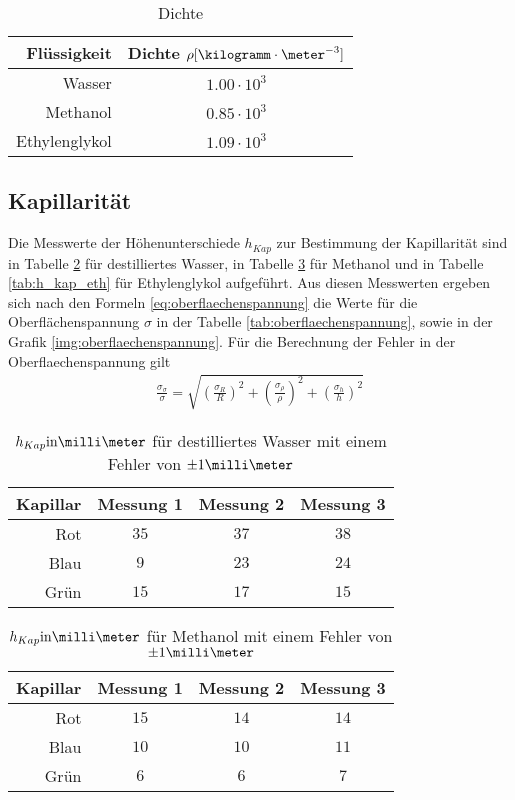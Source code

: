 \documentclass[12pt, a4paper, twoside]{scrartcl}
\begin{document}
\begin{table}[!h]
\centering
\begin{tabular}{r|c}
    Flüssigkeit & Dichte $\rho [\kilogramm\cdot\meter^{-3}]$\\
    \hline
    Wasser & $1.00\cdot 10^{3}$\\
    \hline
    Methanol & $ 0.85\cdot 10^{3}$\\
    \hline
    Ethylenglykol & $ 1.09 \cdot 10^{3}$\\
    
 \end{tabular} 
 \caption{\label{tab:dichte}Dichte}
\end{table}

\subsection{Kapillarität}

Die Messwerte der Höhenunterschiede $h_{Kap}$ zur Bestimmung der Kapillarität sind in Tabelle \ref{tab:h_kap_was} für destilliertes Wasser, in Tabelle \ref{tab:h_kap_met} für Methanol und in Tabelle \ref{tab:h_kap_eth} für Ethylenglykol aufgeführt.
Aus diesen Messwerten ergeben sich nach den Formeln \eqref{eq:oberflaechenspannung} die Werte für die Oberflächenspannung $\sigma$  in der Tabelle \ref{tab:oberflaechenspannung}, sowie in der Grafik \ref{img:oberflaechenspannung}.
Für die Berechnung der Fehler in der Oberflaechenspannung gilt
\begin{align}
  \frac{\sigma_\sigma}{\sigma} = \sqrt{\left(\frac{\sigma_{R}}{R}\right)^2 + \left(\frac{\sigma_{\rho}}{\rho}\right) ^2 + \left(\frac{\sigma_{h}}{h}\right)^2} 
\end{align}

\begin{table}
\centering
\begin{tabular}{r|c|c|c}
    Kapillar & Messung 1 & Messung 2 & Messung 3\\
    \hline
    Rot & $35$ & $37$ & $38$ \\
    Blau & $9$ & $23$ & $24$ \\
    Grün & $15$ & $17$ & $15$ \\
    
 \end{tabular} 
 \caption{\label{tab:h_kap_was}$h_{Kap} \rm{in} \milli\meter$ für destilliertes Wasser mit einem Fehler von $\pm 1\milli\meter$}
\end{table}

\begin{table}
\centering
\begin{tabular}{r|c|c|c}
    Kapillar & Messung 1 & Messung 2 & Messung 3\\
    \hline
    Rot & $15$ & $14$ & $14$\\
    Blau & $10$ & $10$ & $11$ \\
    Grün & $6$ & $6$ & $7$\\
    
 \end{tabular} 
 \caption{\label{tab:h_kap_met}$h_{Kap} \rm{in} \milli\meter$ für Methanol mit einem Fehler von $\pm 1\milli\meter$}
\end{table}
\end{document}
